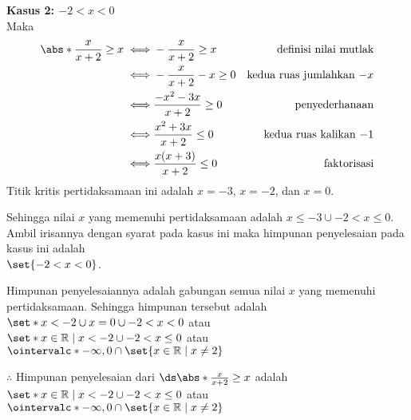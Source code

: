 \begin{enumerate}[leftmargin=*, label={\arabic*}.]
\begin{enumerate}[label={\alph*}.]
\textbf{Kasus 2: $-2 < x < 0$}\\
Maka
\begin{align*}
    \abs*{\frac{x}{x+2}} \geq x
    \iff &-\frac{x}{x+2} \geq x
    &\text{definisi nilai mutlak} \\
    \iff &-\frac{x}{x+2} -x \geq 0
    &\text{kedua ruas jumlahkan $-x$}\\
    \iff &\frac{-x^{2}-3x}{x+2} \geq 0
    &\text{penyederhanaan}\\
    \iff &\frac{x^{2}+3x}{x+2} \leq 0
    &\text{kedua ruas kalikan $-1$}\\
    \iff &\frac{x(x+3)}{x+2} \leq 0
    &\text{faktorisasi}\\
\end{align*}
Titik kritis pertidaksamaan ini adalah $x=-3$, $x=-2$, dan $x=0$.
\begin{center}
\end{center}
Sehingga nilai $x$ yang memenuhi pertidaksamaan adalah $x \leq -3 \cup -2 < x \leq 0$. Ambil 
irisannya dengan syarat pada kasus ini maka himpunan penyelesaian pada kasus ini adalah 
\\$\set{-2 < x < 0}$. 

Himpunan penyelesaiannya adalah gabungan semua nilai $x$ yang memenuhi pertidaksamaan. 
Sehingga himpunan tersebut adalah 
$\set*{x < -2 \cup x = 0 \cup -2 < x < 0}$ 
atau \\
$\set*{x \in \mathbb{R} \mid x < -2 \cup -2 < x \leq 0}$
atau
$\ointervalc*{-\infty,0} \cap \set{x \in \mathbb{R} \mid x \neq 2}$

$\therefore$ Himpunan penyelesaian dari 
$\ds \abs*{\frac{x}{x+2}} \geq x$ adalah 
$\set*{x \in \mathbb{R} \mid x < -2 \cup -2 < x \leq 0}$
atau \\
$\ointervalc*{-\infty,0} \cap \set{x \in \mathbb{R} \mid x \neq 2}$


\end{enumerate}
\end{enumerate}

